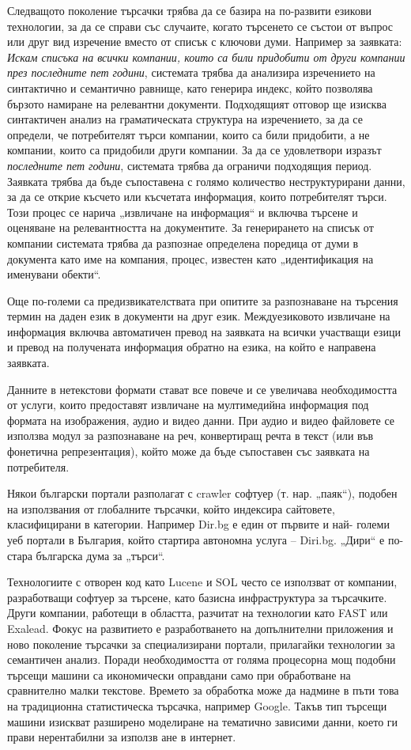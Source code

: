 \begin{multicols}{2}
Следващото поколение търсачки трябва да се базира на
 по-развити езикови технологии, за да се справи със случаите, когато търсенето се състои от въпрос или друг вид изречение вместо от списък с ключови думи. 
 Например за заявката: \textit{Искам списъка на всички компании, които
 са били придобити от други компании през последните пет
 години}, системата трябва да анализира  изречението на синтактично и семантично равнище, като генерира индекс, който позволява бързото намиране на релевантни документи. Подходящият отговор ще изисква синтактичен анализ на граматическата структура на изречението, за да се определи, че потребителят търси компании, които са били придобити, а не компании, които са придобили
 други компании. За да се удовлетвори изразът \textit{последните пет години}, системата трябва да ограничи подходящия период. Заявката трябва да бъде съпоставена с голямо количество неструктурирани данни, за да се
 открие късчето или късчетата информация, които потребителят търси. Този процес се нарича „извличане на информация“ и включва търсене и оценяване на релевантността на  документите. За генерирането на списък от компании системата трябва да разпознае определена поредица от думи
 в документа като име на компания, процес, известен като „идентификация на
 именувани обекти“.

Още по-големи са предизвикателствата при опитите за разпознаване на търсения термин на даден език в документи на друг език. Междуезиковото извличане на информация включва автоматичен превод на заявката
 на всички участващи езици и превод на получената информация обратно на езика, на който е направена заявката.

Данните в нетекстови формати стават все повече и се увеличава необходимостта от услуги, които предоставят извличане на мултимедийна информация под
 формата на изображения, аудио и видео данни. При аудио и видео файловете се използва модул за разпознаване
 на реч, конвертиращ речта в текст (или във
 фонетична репрезентация), който може да бъде
 съпоставен със заявката на потребителя.
 
Някои български портали разполагат с crawler софтуер (т. нар.
 „паяк“), подобен на използвания от глобалните
 търсачки, който индексира сайтовете, класифицирани в
 категории. Например Dir.bg е един от първите и най-
големи уеб портали в България, който стартира
 автономна услуга – Diri.bg. „Дири“ е по-стара българска дума за „търси“. 

Технологиите с отворен код като
 Lucene и SOL често се използват от компании,
 разработващи софтуер за търсене, като базисна
 инфраструктура за търсачките. Други компании,
 работещи в областта, разчитат на технологии като FAST или Exalead.
Фокус на развитието е разработването на допълнителни приложения и ново поколение търсачки за специализирани портали, прилагайки технологии за семантичен анализ. Поради необходимостта от голяма процесорна мощ подобни търсещи машини са икономически оправдани само при обработване на сравнително малки текстове. Времето за обработка може да надмине в пъти това на традиционна статистическа търсачка, например Google. Такъв тип търсещи машини изискват разширено моделиране на тематично зависими данни, което ги прави нерентабилни за използв
 ане в интернет.



\end{multicols}
